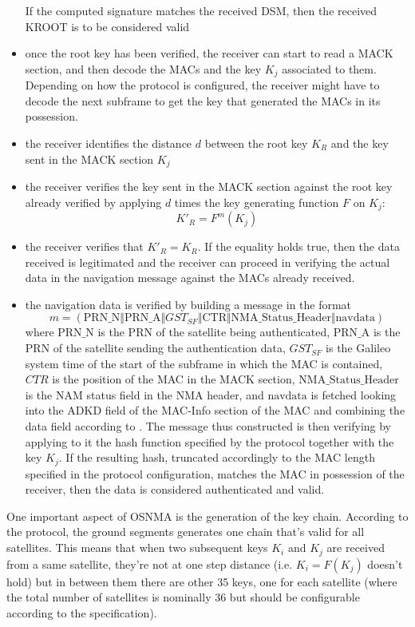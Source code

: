 \begin{itemize}
If the computed signature matches the received DSM, then the received KROOT is
to be considered valid
\item once the root key has been verified, the receiver can start to read a MACK
section, and then decode the MACs and the key $K_j$ associated to them.
Depending on how the protocol is configured, the receiver might have to decode
the next subframe to get the key that generated the MACs in its possession.
\item the receiver identifies the distance $d$ between the root key $K_R$ and
the key sent in the MACK section $K_j$
\item the receiver verifies the key sent in the MACK section against the root
key already verified by applying $d$ times the key generating function $F$ on
$K_j$:
\[
K'_R = F^m(K_j)
\]
\item the receiver verifies that $K'_R = K_R$. If the equality holds true, then
the data received is legitimated and the receiver can proceed in verifying the
actual data in the navigation message against the MACs already received.
\item the navigation data is verified by building a message in the format
\[
m = (\text{PRN\_N} \Vert \text{PRN\_A} \Vert GST_{SF} \Vert \text{CTR} \Vert
\text{NMA\_Status\_Header} \Vert \text{navdata})
\]
where $\text{PRN\_N}$ is the PRN of the satellite being authenticated,
$\text{PRN\_A}$ is the PRN of the satellite sending the authentication data,
$GST_{SF}$ is the Galileo system time of the start of the subframe in which the
MAC is contained, $CTR$ is the position of the MAC in the MACK section,
$\text{NMA\_Status\_Header}$ is the NAM status field in the NMA header, and
$\text{navdata}$ is fetched looking into the ADKD field of the MAC-Info section
of the MAC and combining the data field according to \cite{osnma}. The message
thus constructed is then verifying by applying to it the hash function specified
by the protocol together with the key $K_j$. If the resulting hash, truncated
accordingly to the MAC length specified in the protocol configuration, matches
the MAC in possession of the receiver, then the data is considered authenticated
and valid.
\end{itemize}

\par

One important aspect of OSNMA is the generation of the key chain. According to
the protocol, the ground segments generates one chain that's valid for all
satellites. This means that when two subsequent keys $K_i$ and $K_j$ are
received from a same satellite, they're not at one step distance (i.e. $K_i =
F(K_j)$ doesn't hold) but in between them there are other 35 keys, one for each
satellite (where the total number of satellites is nominally 36 but should be
configurable according to the specification).
